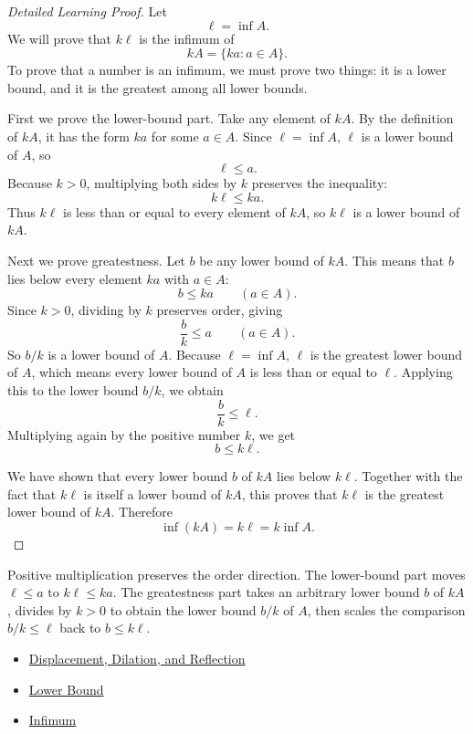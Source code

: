 \begin{proof}[Detailed Learning Proof]
\LRAProofBodyStart
Let
\[
  \ell=\inf A.
\]
We will prove that \(k\ell\) is the infimum of
\[
  kA=\{ka:a\in A\}.
\]
To prove that a number is an infimum, we must prove two things: it is a lower
bound, and it is the greatest among all lower bounds.

First we prove the lower-bound part. Take any element of \(kA\). By the
definition of \(kA\), it has the form \(ka\) for some \(a\in A\). Since
\(\ell=\inf A\), \(\ell\) is a lower bound of \(A\), so
\[
  \ell\le a.
\]
Because \(k>0\), multiplying both sides by \(k\) preserves the inequality:
\[
  k\ell\le ka.
\]
Thus \(k\ell\) is less than or equal to every element of \(kA\), so \(k\ell\)
is a lower bound of \(kA\).

Next we prove greatestness. Let \(b\) be any lower bound of \(kA\). This means
that \(b\) lies below every element \(ka\) with \(a\in A\):
\[
  b\le ka
  \qquad(a\in A).
\]
Since \(k>0\), dividing by \(k\) preserves order, giving
\[
  \frac{b}{k}\le a
  \qquad(a\in A).
\]
So \(b/k\) is a lower bound of \(A\). Because \(\ell=\inf A\), \(\ell\) is the
greatest lower bound of \(A\), which means every lower bound of \(A\) is less
than or equal to \(\ell\). Applying this to the lower bound \(b/k\), we obtain
\[
  \frac{b}{k}\le \ell.
\]
Multiplying again by the positive number \(k\), we get
\[
  b\le k\ell.
\]

We have shown that every lower bound \(b\) of \(kA\) lies below \(k\ell\).
Together with the fact that \(k\ell\) is itself a lower bound of \(kA\), this
proves that \(k\ell\) is the greatest lower bound of \(kA\). Therefore
\[
  \inf(kA)=k\ell=k\inf A.
\]
\end{proof}

\begin{remark*}
Positive multiplication preserves the order direction. The lower-bound part
moves \(\ell\le a\) to \(k\ell\le ka\). The greatestness part takes an
arbitrary lower bound \(b\) of \(kA\), divides by \(k>0\) to obtain the lower
bound \(b/k\) of \(A\), then scales the comparison \(b/k\le\ell\) back to
\(b\le k\ell\).
\end{remark*}

\begin{dependencies}
\begin{itemize}
  \item \hyperref[def:displacement-dilation-reflection]{Displacement, Dilation, and Reflection}
  \item \hyperref[def:real-lower-bound]{Lower Bound}
  \item \hyperref[def:infimum]{Infimum}
\end{itemize}
\end{dependencies}

\clearpage
